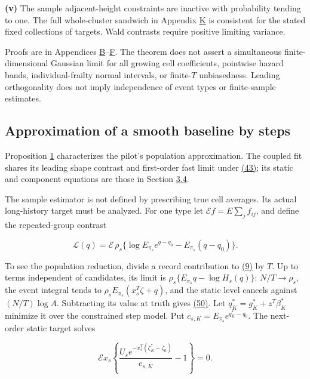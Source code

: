 \documentclass[11pt]{article}
\begin{document}
\textbf{(v)} The sample adjacent-height constraints are inactive with probability tending to one. The full whole-cluster sandwich in Appendix \hyperref[sec:K]{K} is consistent for the stated fixed collections of targets. Wald contrasts require positive limiting variance.

Proofs are in Appendices \hyperref[sec:B]{B}--\hyperref[sec:F]{F}. The theorem does not assert a simultaneous finite-dimensional Gaussian limit for all growing cell coefficients, pointwise hazard bands, individual-frailty normal intervals, or finite-\(T\) unbiasedness. Leading orthogonality does not imply independence of event types or finite-sample estimates.

\subsection{Approximation of a smooth baseline by steps}\label{sec:4.3}

Proposition \hyperref[res:Proposition-1]{1} characterizes the pilot's population approximation. The coupled fit shares its leading shape contrast and first-order fast limit under \hyperref[eq:43]{(43)}; its static and component equations are those in Section \hyperref[sec:3.4]{3.4}.

The sample estimator is not defined by prescribing true cell averages. Its actual long-history target must be analyzed. For one type let \(\mathcal E f=E\sum_j f_{ij}\), and define the repeated-group contrast

\begin{equation*}
\mathcal L(q)=\mathcal E\,\rho_s
 \{\log E_{\pi_s}e^{q-q_0}-E_{\pi_s}(q-q_0)\}.
\tag{50}\label{eq:50}
\end{equation*}

To see the population reduction, divide a record contribution to \hyperref[eq:9]{(9)} by \(T\). Up to terms independent of candidates, its limit is \(\rho_s\{E_{\pi_s}q-\log H_s(q)\}\): \(N/T\to\rho_s\), the event integral tends to \(\rho_s E_{\pi_s}(x_s^T\zeta+q)\), and the static level cancels against \((N/T)\log A\). Subtracting its value at truth gives \hyperref[eq:50]{(50)}. Let \(q_K^*=g_K^*+z^T\beta_K^*\) minimize it over the constrained step model. Put
\(c_{s,K}=E_{\pi_s}e^{q_K^*-q_0}\). The next-order static target solves

\begin{equation*}
\mathcal E x_s\left\{\frac{U_s e^{-x_s^T(\zeta_K^*-\zeta_0)}}{c_{s,K}}-1\right\}=0 .
\tag{51}\label{eq:51}
\end{equation*}
\end{document}

